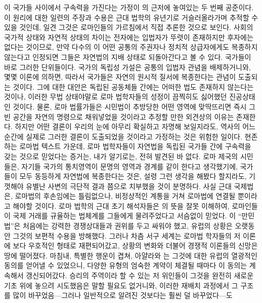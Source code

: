 이 국가들 사이에서 구속력을 가진다는 가정이
의 근저에 놓여있는 두 번째 공준이다.
이 원리에 대한 일련의 주장과 수용은 근대 법학의 유년기로 거슬러올라가며
추적할 수 있을 것인데,
일견 그것은 로마인들의 가르침에서 직접 추론한 것으로 보인다.
사회의 국가적 상태와 자연적 상태의 차이는
전자에는 입법자가 뚜렷이 존재하지만 후자에는 없다는 것이므로,
만약 다수의 이
어떤 공통의 주권자나 정치적 상급자에게도
복종하지 않는다고 인정되면 그들은 자연법의 지배 상태로 되돌아간다고 볼 수 있다.
국가들이 바로 그러한 단위들이다.
국가의 독립성 가설은 공통의 입법자 관념을 배제하거니와,
몇몇 이론에 의하면,
따라서 국가들은 자연의 원시적 질서에 복종한다는 관념이 도출되는 것이다.
그에 대한 대안은 독립된 공동체들 간에는 어떠한 법도 존재하지 않는다는 것이나,
이러한 무법 상태야말로
로마 법학자들의 성정이 끔찍히도 싫어했던 진공상태인 것이다.
물론, 로마 법률가들은 시민법이 추방당한 어떤 영역에 맞딱뜨리면
즉시 그 빈 공간을 자연의 명령으로 채워넣었을 것이라고 추정할 만한
외견상의 이유는 존재한다.
하지만 어떤 결론이 우리의 눈에 아무리 확실하고 자명해 보일지라도,
역사의 어느 순간에
실제로 그러한 결론이 도출되었을 것이라고 가정하는 것은 위험한 일이다.
현존하는 로마법 텍스트 가운데,
로마 법학자들이 자연법을 독립된 국가들 간에 구속력을 갖는 것으로
믿었다는 증거는, 내가 알기로는, 전혀 발견된 바 없다.
로마 제국의 시민들은,
자기들 국가의 통치영역이 문명의 영역과 경계를 같이 한다고 생각했기에,
국가들이 모두 동등하게 자연법에 복종한다는 것은,
설령 그런 생각을 해봤다 할지라도,
기껏해야 유별난 사변의 극단적 결과 쯤으로 치부했을 것이 분명하다.
사실 근대 국제법은,
로마법의 후손임에는 틀림없으나,
비정상적인 계통을 거쳐 로마법에 연결될 뿐이라고 해야할 것이다.
로마 법학의 근대 초기 해석자들은
의 뜻을 잘못 이해하여,
로마인들이 국제 거래를 규율하는 법체계를 그들에게 물려주었다고
서슴없이 믿었다.
이 ``만민법''은 처음에는 강력한 경쟁상대들과
권위를 두고 싸워야 했고,
유럽의 상황은 오랫동안 그것의 보편적 수용을 방해했다.
그러나 차츰 서구 세계는 로마법 학자들의 저 이론에
보다 우호적인 형태로 재편되어갔고,
상황의 변화와 더불어 경쟁적 이론들의 신망은 땅에 떨어졌다.
마침내, 특별한 행운이 겹쳐,
아얄라와 는 그것에 대한 유럽의 열광적인 동의를
얻어낼 수 있었으니, 다양한 유형의 엄숙한 계약이 체결될 때마다 이 동의는
계속해서 갱신되어갔다.
승리의 주역이라 할 수 있는 저 위인들이
그것을 완전히 새로운 기초 위에 놓으려 시도했음은 말할 필요도 없거니와,
이러한 재배치 과정에서 그 구조를
많이 바꾸었음---그러나 일반적으로 알려진 것보다는 훨씬 덜 바꾸었다---도
